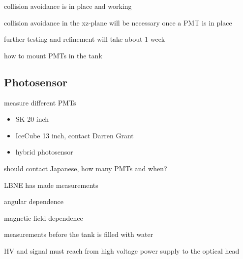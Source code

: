 collision avoidance is in place and working

collision avoidance in the xz-plane will be necessary once a PMT is in place

further testing and refinement will take about 1 week

how to mount PMTs in the tank




\subsection{Photosensor}

measure different PMTs
\begin{itemize}
\item SK 20 inch
\item IceCube 13 inch, contact Darren Grant
\item hybrid photosensor
\end{itemize}

should contact Japanese, how many PMTs and when?

LBNE has made measurements

angular dependence

magnetic field dependence


measurements before the tank is filled with water

HV and signal must reach from high voltage power supply to the optical
head

